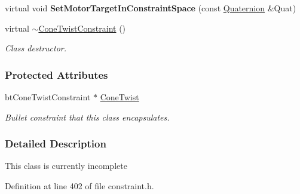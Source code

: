 \begin{DoxyCompactItemize}
\item 
\hypertarget{classMezzanine_1_1ConeTwistConstraint_a846d9d18b94603b3fcc8fb83510d4510}{
virtual void {\bfseries SetMotorTargetInConstraintSpace} (const \hyperlink{classMezzanine_1_1Quaternion}{Quaternion} \&Quat)}
\label{classMezzanine_1_1ConeTwistConstraint_a846d9d18b94603b3fcc8fb83510d4510}

\item 
virtual \hyperlink{classMezzanine_1_1ConeTwistConstraint_a69d510c9f0292b160d9f129f6d2db7f8}{$\sim$ConeTwistConstraint} ()
\begin{DoxyCompactList}\small\item\em Class destructor. \item\end{DoxyCompactList}\end{DoxyCompactItemize}
\subsubsection*{Protected Attributes}
\begin{DoxyCompactItemize}
\item 
\hypertarget{classMezzanine_1_1ConeTwistConstraint_a7920115fb30ebd57046b1966f5e61068}{
btConeTwistConstraint $\ast$ \hyperlink{classMezzanine_1_1ConeTwistConstraint_a7920115fb30ebd57046b1966f5e61068}{ConeTwist}}
\label{classMezzanine_1_1ConeTwistConstraint_a7920115fb30ebd57046b1966f5e61068}

\begin{DoxyCompactList}\small\item\em Bullet constraint that this class encapsulates. \item\end{DoxyCompactList}\end{DoxyCompactItemize}


\subsubsection{Detailed Description}
This class is currently incomplete 

Definition at line 402 of file constraint.h.



